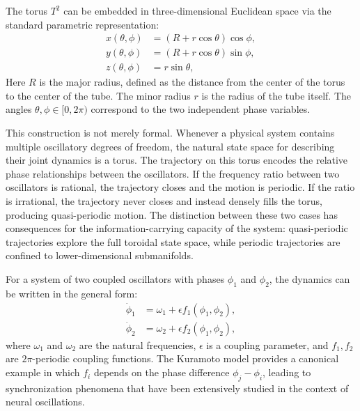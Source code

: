 \documentclass[12pt,a4paper]{article}
\makeatletter
\let\orig@subsection\subsection
\renewcommand{\subsection}{\@ifstar{\orig@subsection*}{\@dblarg{\my@subsection}}}
\def\my@subsection[#1]#2{\orig@subsection[#1]{#2}\noindent\@afterindentfalse\@afterheading}
\makeatother
\begin{document}
The torus $T^2$ can be embedded in three-dimensional Euclidean space via the standard parametric representation:
\begin{align}
  x(\theta, \phi) &= (R + r\cos\theta)\cos\phi, \label{eq:torus_x} \\
  y(\theta, \phi) &= (R + r\cos\theta)\sin\phi, \label{eq:torus_y} \\
  z(\theta, \phi) &= r\sin\theta, \label{eq:torus_z}
\end{align}
Here $R$ is the major radius, defined as the distance from the center of the torus to the center of the tube. The minor radius $r$ is the radius of the tube itself. The angles $\theta, \phi \in [0, 2\pi)$ correspond to the two independent phase variables.

\subsection{Coupled Oscillator Dynamics on the Torus}

This construction is not merely formal.
Whenever a physical system contains multiple oscillatory degrees of freedom, the natural state space for describing their joint dynamics is a torus.
The trajectory on this torus encodes the relative phase relationships between the oscillators.
If the frequency ratio between two oscillators is rational, the trajectory closes and the motion is periodic.
If the ratio is irrational, the trajectory never closes and instead densely fills the torus, producing quasi-periodic motion.
The distinction between these two cases has consequences for the information-carrying capacity of the system: quasi-periodic trajectories explore the full toroidal state space, while periodic trajectories are confined to lower-dimensional submanifolds.

For a system of two coupled oscillators with phases $\phi_1$ and $\phi_2$, the dynamics can be written in the general form:
\begin{align}
  \dot{\phi}_1 &= \omega_1 + \epsilon f_1(\phi_1, \phi_2), \label{eq:coupled1} \\
  \dot{\phi}_2 &= \omega_2 + \epsilon f_2(\phi_1, \phi_2), \label{eq:coupled2}
\end{align}
where $\omega_1$ and $\omega_2$ are the natural frequencies, $\epsilon$ is a coupling parameter, and $f_1, f_2$ are $2\pi$-periodic coupling functions.
The Kuramoto model \cite{Kuramoto1984, Strogatz2000} provides a canonical example in which $f_i$ depends on the phase difference $\phi_j - \phi_i$, leading to synchronization phenomena that have been extensively studied in the context of neural oscillations.
\end{document}
